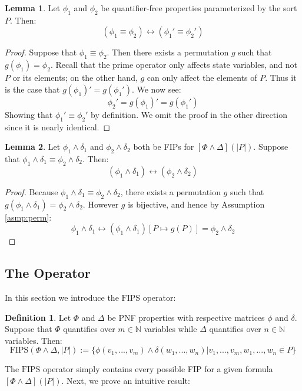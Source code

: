 \documentclass[12pt]{article}
\theoremstyle{definition}
\newtheorem{lemma}{Lemma}
\newtheorem{definition}{Definition}
\theoremstyle{remark}
\newcommand{\fips}{\text{FIPS}}
\begin{document}
\begin{lemma}
  \label{lem:prime-bijec}
  Let $\phi_1$ and $\phi_2$ be quantifier-free properties parameterized by the sort $P$.  Then:
  $$(\phi_1 \equiv \phi_2) \leftrightarrow (\phi_1' \equiv \phi_2')$$
\end{lemma}
\begin{proof}
  Suppose that $\phi_1 \equiv \phi_2$.  Then there exists a permutation $g$ such that $g(\phi_1) = \phi_2$.  Recall that the prime operator only affects state variables, and not $P$ or its elements; on the other hand, $g$ can only affect the elements of $P$.  Thus it is the case that $g(\phi_1)' = g(\phi_1')$.  We now see:
  $$\phi_2' = g(\phi_1)' = g(\phi_1')$$
  Showing that $\phi_1' \equiv \phi_2'$ by definition.  We omit the proof in the other direction since it is nearly identical.
\end{proof}

\begin{lemma}
  \label{lem:eqiv-bijec}
  Let $\phi_1\land\delta_1$ and $\phi_2\land\delta_2$ both be FIPs for $[\Phi\land\Delta](|P|)$.  Suppose that $\phi_1\land\delta_1 \equiv \phi_2\land\delta_2$.  Then:
  $$(\phi_1 \land \delta_1) \leftrightarrow (\phi_2 \land \delta_2)$$
\end{lemma}
\begin{proof}
  Because $\phi_1\land\delta_1 \equiv \phi_2\land\delta_2$, there exists a permutation $g$ such that $g(\phi_1\land\delta_1) = \phi_2\land\delta_2$.  However $g$ is bijective, and hence by Assumption \ref{asmp:perm}:
  $$\phi_1\land\delta_1 \leftrightarrow (\phi_1\land\delta_1)[P \mapsto g(P)] = \phi_2\land\delta_2$$
\end{proof}

\subsection{The \fips Operator}

In this section we introduce the $\fips$ operator:
\begin{definition}
  Let $\Phi$ and $\Delta$ be PNF properties with respective matrices $\phi$ and $\delta$.  Suppose that $\Phi$ quantifies over $m \in \mathbb{N}$ variables while $\Delta$ quantifies over $n \in \mathbb{N}$ variables.  Then:
  $$\fips(\Phi \land \Delta, |P|) := \{\phi(v_1,...,v_m) \land \delta(w_1,...,w_n) | v_1,...,v_m,w_1,...,w_n \in P\}$$
\end{definition}

The $\fips$ operator simply contains every possible FIP for a given formula $[\Phi\land\Delta](|P|)$.  Next, we prove an intuitive result:
\end{document}
